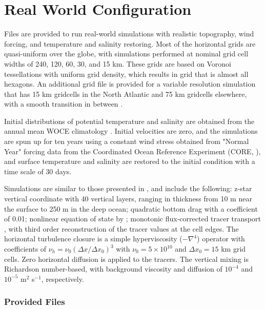 \section{Real World Configuration}
\label{subsec:realWorld_description}

Files are provided to run real-world simulations with realistic topography, wind forcing, and temperature and salinity restoring.  
Most of the horizontal grids are quasi-uniform over the globe, with simulations performed at nominal grid cell widths of 240, 120, 60, 30, and 15 km.  These grids are based on Voronoi tessellations with uniform grid density, which results in grid that is almost all hexagons.  An additional grid file is provided for a variable resolution simulation that has 15 km gridcells in the North Atlantic and 75 km gridcells elsewhere, with a smooth transition in between \citep[Figure 2]{Ringler_ea13om}.

Initial distributions of potential temperature and salinity are obtained from the annual mean WOCE climatology \citep{Gouretski:2004wv}.  Initial velocities are zero, and the simulations are spun up for ten years using a constant wind stress obtained from "Normal Year" forcing data from the Coordinated Ocean Reference Experiment (CORE, \citet{Large:2004ug}), and surface temperature and salinity are restored to the initial condition with a time scale of 30 days.  

Simulations are similar to those presented in \citet{Ringler_ea13om}, and include the following: z-star vertical coordinate with 40 vertical layers, ranging in thickness from 10 m near the surface to 250 m in the deep ocean; quadratic bottom drag with a coefficient of 0.01; nonlinear equation of state by \citet{Jackett_McDougall95jaot}; monotonic flux-corrected tracer transport \citep{Skamarock_Gassmann11jcp}, with third order reconstruction of the tracer values at the cell edges.  The horizontal turbulence closure is a simple hyperviscosity ($-\nabla^4$) operator with coefficients of $\nu_h = \nu_0 (\Delta x / \Delta x_0)^3$ with $\nu_0=5\times10^{10}$ and $\Delta x_0=15$ km grid cells.  Zero horizontal diffusion is applied to the tracers.  The vertical mixing is Richardson number-based, with background viscosity and diffusion of $10^{-4}$ and $10^{-5}$ m$^2$ s$^{-1}$, respectively.


\subsubsection{Provided Files}
\label{subsubsec:realWorld_files}

